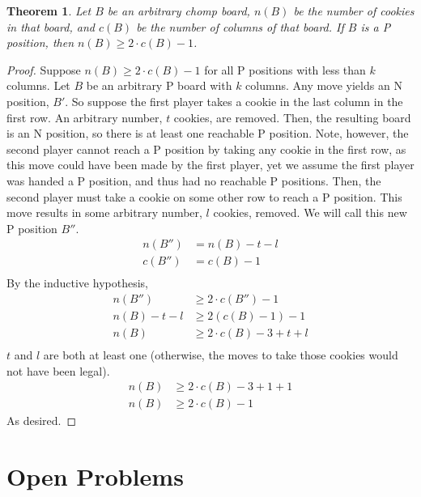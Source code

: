 \documentclass{amsart}
\newtheorem{thm}{Theorem}
\theoremstyle{definition}
\theoremstyle{remark}
\numberwithin{equation}{section}
\begin{document}
\begin{thm}
	Let $B$ be an arbitrary chomp board, $n(B)$ be the number of cookies in that board, and $c(B)$ be the number of columns of that board.  If $B$ is a P position, then $n(B) \geq 2\cdot c(B) - 1$.
\end{thm}

\begin{proof}
	Suppose $n(B) \geq 2\cdot c(B)-1$ for all P positions with less than $k$ columns.  Let $B$ be an arbitrary P board with $k$ columns.  Any move yields an N position, $B'$.  So suppose the first player takes a cookie in the last column in the first row.  An arbitrary number, $t$ cookies, are removed.  Then, the resulting board is an N position, so there is at least one reachable P position.  Note, however, the second player cannot reach a P position by taking any cookie in the first row, as this move could have been made by the first player, yet we assume the first player was handed a P position, and thus had no reachable P positions.  Then, the second player must take a cookie on some other row to reach a P position.  This move results in some arbitrary number, $l$ cookies, removed.  We will call this new P position $B''$.
	\begin{align*}
		n(B'') &= n(B) - t - l\\
		c(B'') &= c(B) - 1\\
	\end{align*}
	By the inductive hypothesis,
	\begin{align*}
		n(B'') &\geq 2\cdot c(B'')-1\\
		n(B) - t - l &\geq 2(c(B) - 1)-1\\
		n(B) &\geq 2\cdot c(B) - 3 + t + l\\
	\end{align*}
	$t$ and $l$ are both at least one (otherwise, the moves to take those cookies would not have been legal).
	\begin{align*}
		n(B) &\geq 2\cdot c(B) -3 + 1 + 1\\
		n(B) &\geq 2\cdot c(B) - 1
	\end{align*}
	As desired.
\end{proof}
\section{Open Problems}



\end{document}

